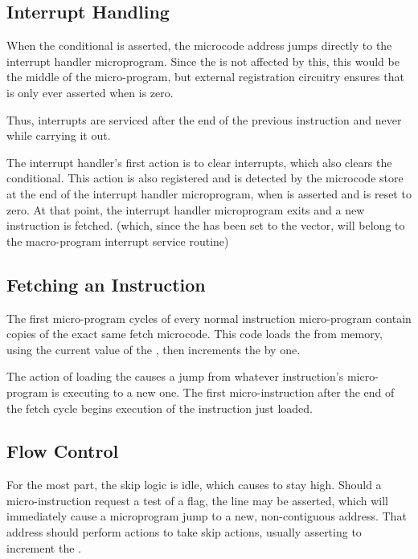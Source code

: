 \subsection{Interrupt Handling}

When the  conditional is asserted, the microcode address jumps
directly to the interrupt handler microprogram. Since the \UPC{} is
not affected by this, this would be the middle of the micro-program,
but external registration circuitry ensures that  is only ever
asserted when \UPC{} is zero.

Thus, interrupts are serviced after the end of the previous
instruction and never while carrying it out.

The interrupt handler's first action is to clear interrupts, which
also clears the  conditional. This action is also registered
and is detected by the microcode store at the end of the interrupt
handler microprogram, when  is asserted and \UPC{} is reset to
zero. At that point, the interrupt handler microprogram exits and a
new instruction is fetched. (which, since the \PC{} has been set to the
 vector, will belong to the macro-program interrupt service
routine)

\subsection{Fetching an Instruction}

The first micro-program cycles of every normal instruction
micro-program contain copies of the exact same fetch microcode. This
code loads the \IR{} from memory, using the current value of the
\PC{}, then increments the \PC{} by one.

The action of loading the \IR{} causes a jump from whatever
instruction's micro-program is executing to a new one. The first
micro-instruction after the end of the fetch cycle begins execution of
the instruction just loaded.

\subsection{Flow Control}

For the most part, the skip logic is idle, which causes  to
stay high. Should a micro-instruction request a test of a flag, the
 line may be asserted, which will immediately cause a
microprogram jump to a new, non-contiguous address. That address
should perform actions to take skip actions, usually asserting
 to increment the \PC{}.

